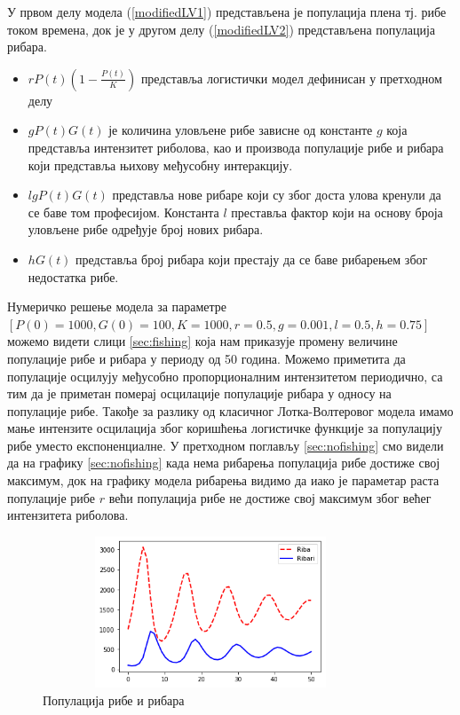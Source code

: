 \documentclass[a4paper]{article}
\begin{document}
{У првом делу модела (\ref{modifiedLV1}) представљена је популација плена тј. рибе током времена, док је у другом делу (\ref{modifiedLV2}) представљена популација рибара.
\begin{itemize}
  \item $ rP(t)\left(1-\frac{P(t)}{K}\right)$ представља логистички модел дефинисан у претходном делу
  \item $gP(t)G(t)$ је количина уловљене рибе зависне од константе $g$ која представља интензитет риболова, као и производа популације рибе и рибара који представља њихову међусобну интеракцију.
  \item $lgP(t)G(t)$ представља нове рибаре који су због доста улова кренули да се баве том професијом. Константа $l$ преставља фактор који на основу броја уловљене рибе одређује број нових рибара.
  \item $hG(t)$ представља број рибара који престају да се баве рибарењем због недостатка рибе.
  
\end{itemize}
Нумеричко решење модела за параметре $[P(0)=1000, G(0)=100, K=1000, r=0.5, g=0.001, l=0.5, h=0.75] $ можемо видети слици \ref{sec:fishing} која нам приказује промену величине популације рибе и рибара у периоду од 50 година. Можемо приметита да популације осцилују међусобно пропорционалним интензитетом периодично, са тим да је приметан померај осцилације популације рибара у односу на популације рибе. Такође за разлику од класичног Лотка-Волтеровог модела имамо мање интензите осцилација због коришћења логистичке функције за популацију рибе уместо експоненциалне. У претходном поглављу \ref{sec:nofishing} смо видели да на графику \ref{sec:nofishing} када нема рибарења популација рибе достиже свој максимум, док на графику модела рибарења видимо да иако је параметар раста популације рибе $r$ већи популација рибе не достиже свој максимум због већег интензитета риболова.

 \begin{figure}[h!]
	\centering
	\includegraphics[width=10cm,height=4.5cm]{images/FishPopulationFishing.png}
	\caption{Популација рибе и рибара}
	\label{fishfishing_view}
\end{figure}

}
\end{document}

